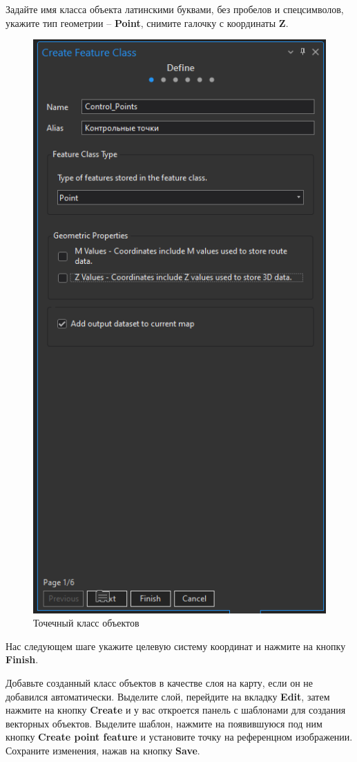 \documentclass[
  12pt,
]{book}
\begin{document}
Задайте имя класса объекта латинскими буквами, без пробелов и спецсимволов, укажите тип геометрии -- \textbf{Point}, снимите галочку с координаты \textbf{Z}.

\begin{figure}
\centering
\includegraphics{images/Ref02/Arc_Create_Points.png}
\caption{Точечный класс объектов}
\end{figure}

Нас следующем шаге укажите целевую систему координат и нажмите на кнопку \textbf{Finish}.

Добавьте созданный класс объектов в качестве слоя на карту, если он не добавился автоматически. Выделите слой, перейдите на вкладку \textbf{Edit}, затем нажмите на кнопку \textbf{Create} и у вас откроется панель с шаблонами для создания векторных объектов. Выделите шаблон, нажмите на появившуюся под ним кнопку \textbf{Create point feature} и установите точку на референцном изображении. Сохраните изменения, нажав на кнопку \textbf{Save}.
\end{document}
